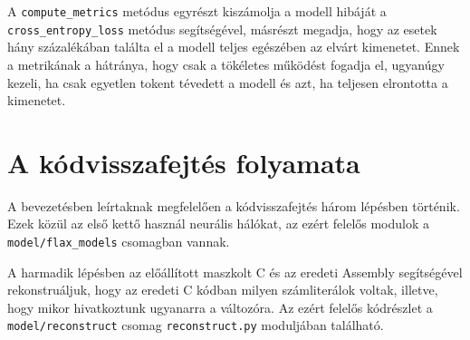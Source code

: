 A \texttt{compute\_metrics} metódus egyrészt kiszámolja a modell hibáját a \texttt{cross\_entropy\_loss}
metódus segítségével, másrészt megadja, hogy az esetek hány százalékában találta el a modell teljes
egészében az elvárt kimenetet. Ennek a metrikának a hátránya, hogy csak a tökéletes működést fogadja el,
ugyanúgy kezeli, ha csak egyetlen tokent tévedett a modell és azt, ha teljesen elrontotta a kimenetet.

\section{A kódvisszafejtés folyamata}
    A bevezetésben leírtaknak megfelelően a kódvisszafejtés három lépésben történik. Ezek közül
    az első kettő használ neurális hálókat, az ezért felelős modulok a \texttt{model/flax\_models}
    csomagban vannak.
    
    A harmadik lépésben az előállított maszkolt C és az eredeti Assembly segítségével rekonstruáljuk,
    hogy az eredeti C kódban milyen számliterálok voltak, illetve, hogy mikor hivatkoztunk ugyanarra
    a változóra. Az ezért felelős kódrészlet a \texttt{model/reconstruct} csomag \texttt{reconstruct.py}
    moduljában található.

